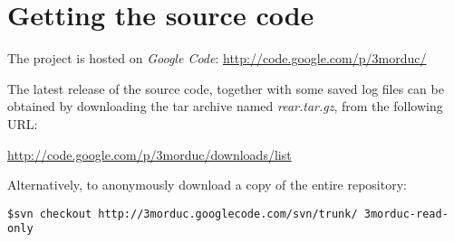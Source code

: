\section{Getting the source code}
\label{sec:gettingsourcecode}
%
The \framework{} project is hosted on \textit{Google Code}:
%
\vspace{20pt}
\url{http://code.google.com/p/3morduc/}
\vspace{20pt}
%

%
The latest release of the source code, together with
some saved log files can be obtained by downloading
the tar archive named \textit{rear.tar.gz}, from the
following URL:
%

%
\vspace{20pt}
\url{http://code.google.com/p/3morduc/downloads/list}
\vspace{20pt}
%

%
Alternatively, to anonymously download a copy of the 
entire repository:
\vspace{20pt}
\begin{verbatim}
$svn checkout http://3morduc.googlecode.com/svn/trunk/ 3morduc-read-only
\end{verbatim}
\vspace{20pt}
%

%

